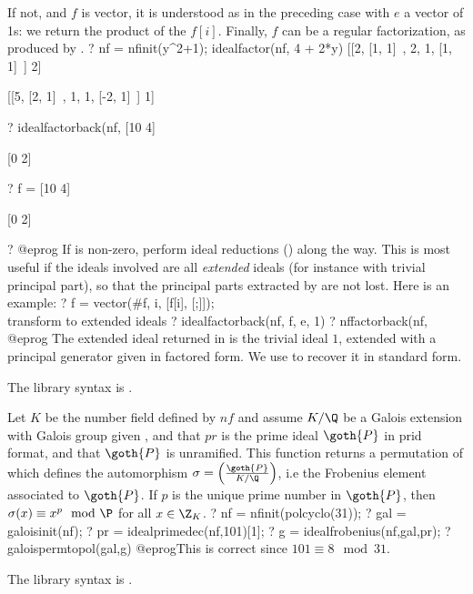 If not, and $f$ is vector, it is understood as in the preceding case with $e$
a vector of 1s: we return the product of the $f[i]$. Finally, $f$ can be a
regular factorization, as produced by .
\bprog
? nf = nfinit(y^2+1); idealfactor(nf, 4 + 2*y)
[[2, [1, 1]~, 2, 1, [1, 1]~] 2]

[[5, [2, 1]~, 1, 1, [-2, 1]~] 1]

? idealfactorback(nf, %
[10 4]

[0  2]

? f = %
[10 4]

[0  2]

? %
@eprog
If  is non-zero, perform ideal reductions () along the
way. This is most useful if the ideals involved are all \emph{extended}
ideals (for instance with trivial principal part), so that the principal parts
extracted by  are not lost. Here is an example:
\bprog
? f = vector(#f, i, [f[i], [;]]);  \\ transform to extended ideals
? idealfactorback(nf, f, e, 1)
? nffactorback(nf, %
@eprog
The extended ideal returned in  is the trivial ideal $1$, extended
with a principal generator given in factored form. We use 
to recover it in standard form.

The library syntax is .

\label{se:idealfrobenius}
Let $K$ be the number field defined by $nf$ and assume $K/\Q$ be a
Galois extension with Galois group given ,
and that $pr$ is the prime ideal $\goth{P}$ in prid format, and that
$\goth{P}$ is unramified.
This function returns a permutation of  which defines the
automorphism $\sigma=\left(\goth{P}\over K/\Q \right)$, i.e the Frobenius
element associated to $\goth{P}$. If $p$ is the unique prime number
in $\goth{P}$, then $\sigma(x)\equiv x^p\mod\P$ for all $x\in\Z_K$.
\bprog
? nf = nfinit(polcyclo(31));
? gal = galoisinit(nf);
? pr = idealprimedec(nf,101)[1];
? g = idealfrobenius(nf,gal,pr);
? galoispermtopol(gal,g)
@eprog\noindent This is correct since $101\equiv 8\mod{31}$.

The library syntax is .


